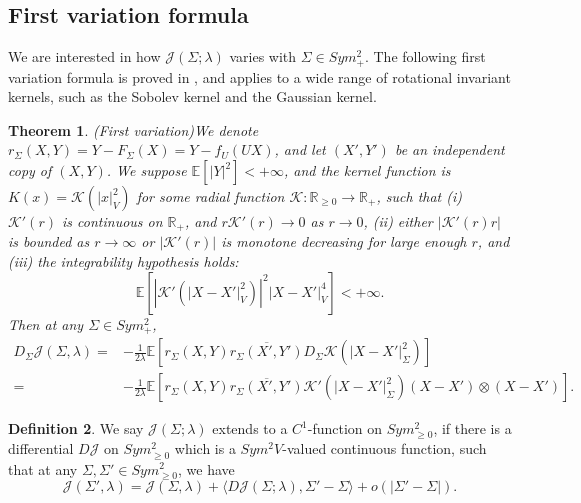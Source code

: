 \documentclass[a4paper]{article}
\newtheorem{thm}{Theorem}[section]
\theoremstyle{definition}
\newtheorem{Def}[thm]{Definition}
\newcommand{\R}{\mathbb{R}}
\newcommand{\E}{\mathbb{E}}
\newcommand{\1}{\mathbbm{1}}
\begin{document}
	
	
	
	
	
	\subsection{First variation formula}
	
	
	
	
	
	
	
	
	
	We are interested in how $\mathcal{J}(\Sigma;\lambda)$ varies with $\Sigma\in Sym^2_+$. The following first variation formula is proved in \cite[Section 4.2]{RuanLi}, and applies to a wide range of rotational invariant kernels, such as the Sobolev kernel and the Gaussian kernel.
	
	
	
	
	\begin{thm}(First variation)\label{thm:firstvariation}
		We denote $r_\Sigma(X,Y)=Y-F_\Sigma(X)= Y-f_U(UX)$, and let $(X',Y')$ be an independent copy of $(X,Y)$. 
		We suppose $\E[|Y|^2]<+\infty$, and the kernel function is $K(x)=\mathcal{K}(|x|^2_V)$ for some radial function
		$\mathcal{K}:\R_{\geq 0}\to \R_+$, such that {(i)} $\mathcal{K}'(r)$ is continuous on $\R_+$, and $r\mathcal{K}'(r)\to 0$ as $r\to 0$, (ii) either $|\mathcal{K}'(r) r|$ is bounded as $r \to \infty$ or $|\mathcal{K}'(r)|$ is monotone decreasing for large enough $r$, and (iii) the integrability hypothesis holds:
		\[
		\E[ |\mathcal{K}'(|X-X'|^2_V)|^2 |X-X'|_V^4   ] <+\infty.
		\]
		Then at any $\Sigma\in Sym^2_+$, 
		\begin{equation*}\label{eqn:Jfirstvariation3}
			\begin{split}
				D_\Sigma \mathcal{J}(\Sigma, \lambda)= &   -\frac{1}{2\lambda}   \E[  r_\Sigma(X,Y) \overline{ r_\Sigma(X',Y')}  D_\Sigma \mathcal{K}(|X-X'|_{\Sigma}^2) ] 
				\\
				= &   -\frac{1}{2\lambda}   \E[  r_\Sigma(X,Y) \overline{r_\Sigma(X',Y')}  \mathcal{K}'(|X-X'|_{\Sigma}^2) (X-X')\otimes (X-X') ] .
			\end{split}
		\end{equation*}
		
	\end{thm}
	
	
	
	
	\begin{Def}\label{def:C1ext}
		We say $\mathcal{J}(\Sigma;\lambda)$ extends to a $C^1$-function on $Sym^2_{\geq 0}$, if there is a differential $D\mathcal{J}$ on $Sym^2_{\geq 0}$ which is a $Sym^2 V$-valued  continuous function, such that at any $\Sigma,\Sigma'\in Sym^2_{\geq 0}$, we have
		\[
		\mathcal{J}(\Sigma',\lambda)= \mathcal{J}(\Sigma, \lambda)+ \langle D\mathcal{J}(\Sigma;\lambda),\Sigma'-\Sigma\rangle +o(|\Sigma'-\Sigma|).
		\]
	\end{Def}
	
\end{document}
